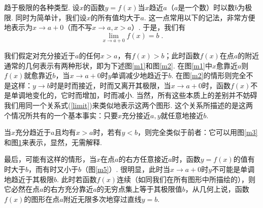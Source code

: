 \documentclass[color=cyan,mathpazo,titlestyle=hang]{elegantbook_mac}
\begin{document}
\textsf{趋于极限的各种类型}. 设$x$的函数$y = f(x)$当$x$趋近$a$（$a$是一个数）时以数$b$为极限. 同时为简单计，我们设$x$的所有值均大于$a$. 这一点常用以下的记法，非常方便地表示为$x\to a+0$（而不写$x\to a, x > a$）. 于是，我们有
\begin{equation}\label{limit}
	\lim_{x\to a+0} f(x) = b\; .
\end{equation}

我们假定对充分接近于$a$的任何$x>a$，有$f(x)>b$；此时函数$f(x)$在点$a$的附近通常的几何表示有两种形状，即为下述图\ref{m1}和图\ref{m2}. 在图\ref{m1}中$x$愈靠近$a$则$f(x)$就愈靠近$b$，当$x\to a+0$时$y$单调减少地趋近于$b$. 在图\ref{m2}的情形则完全不是这样：$y\to b$时是时而接近，时而又离开其极限，当$x\to a+0$时，函数$f(x)$不是单调地变化的，它时而增加，时而减小. 当然，所有这些本质上的差别并不妨碍我们用同一个关系式(\ref{limit})来类似地表示这两个图形. 这个关系所描述的是这两个情况所共有的一个基本事实：只要$x$充分接近$a, y$就任意地接近$b$.

当$x$充分趋近于$a$且均有$x>a$时，若有$y<b$，则完全类似于前者：它可以用图\ref{m3}和图\ref{m4}来表示，显然，无需解释. 

\begin{figure}[h]
\begin{minipage}[b]{5cm}
\caption{}\label{m3}
\end{minipage}
\hfill
\begin{minipage}[b]{5cm}
\caption{}\label{m4}
\end{minipage}
\end{figure}

最后，可能有这样的情形，当$x$在点$a$的右方任意接近$a$时，函数$y=f(x)$的值有时大于$b$，而有时又小于$b$（图\ref{m5}）. 很明显，此时当$x\to a+0$时$y$不可能是单调地趋近于其极限$b$. 此时若函数$f(x)$连续（如同我们在所有图形中所描绘的），则它必然在点$a$的右方充分靠近$a$的无穷点集上等于其极限值$b$，从几何上说，函数$f(x)$的图形在点$a$附近无限多次地穿过直线$y=b$. 
\end{document}
